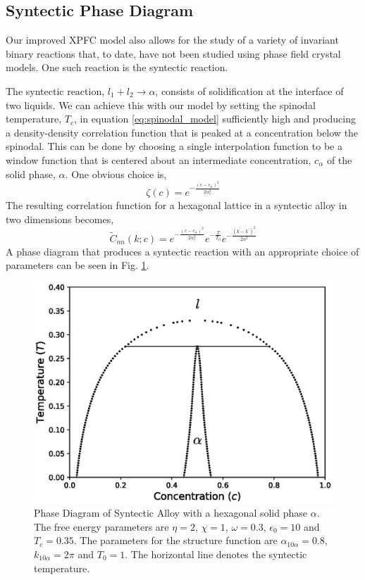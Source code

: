 \documentclass[showkeys, prb, reprint]{revtex4-1}
\newcommand{\f}{\frac}          %
\begin{document}
\subsection{Syntectic Phase Diagram} %

Our improved XPFC model also allows for the study of a variety of invariant
binary reactions that, to date, have not been studied using phase field crystal
models. One such reaction is the syntectic reaction. 

The syntectic reaction, $l_1 + l_2 \rightarrow \alpha $, consists of
solidification at the interface of two liquids. We can achieve this with our
model by setting the spinodal temperature, $T_c$, in equation
\ref{eq:spinodal_model} sufficiently high and producing a density-density
correlation function that is peaked at a concentration below the spinodal. This
can be done by choosing a single interpolation function to be a window 
function that is centered about an intermediate concentration, $c_\alpha$ of 
the solid phase, $\alpha$. One obvious choice is, 
%
\begin{equation}
  \zeta(c) = e^{- \f{(c - c_\alpha)^2}{2 \alpha_c^2}}
\end{equation}
%
The resulting correlation function for a hexagonal lattice in a syntectic alloy
in two dimensions becomes, 
%
\begin{equation}
  \tilde{C}_{nn}(k; c) = 
    e^{-\f{(c - c_\alpha)^2}{2 \alpha_c^2}}
    e^{-\f{T}{T_0}} 
    e^{-\f{(k - k^\prime)^2}{2\alpha^2}}
\end{equation}
%
A phase diagram that produces a syntectic reaction with an appropriate choice
of parameters can be seen in Fig. \ref{syntectic}.

\begin{figure}
	\includegraphics[scale=0.5]{syntectic.eps}
    \caption[Syntectic Phase Diagram]{
        \label{syntectic} Phase Diagram of Syntectic Alloy with a hexagonal
        solid phase $\alpha$. The free energy parameters are $\eta=2$,
        $\chi=1$, $\omega=0.3$, $\epsilon_0 = 10$ and $T_c=0.35$. The
        parameters for the structure function are $\alpha_{10\alpha} = 0.8$,
        $k_{10\alpha} = 2\pi$ and $T_0 = 1$. The horizontal line denotes the
        syntectic temperature.
    }
\end{figure}
\end{document}
